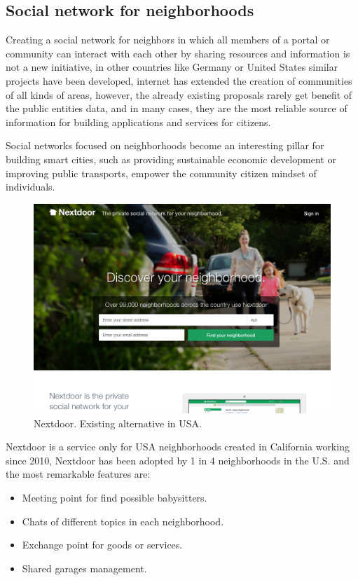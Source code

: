\documentclass{DeustoFDP}
\begin{document}
\subsection{Social network for neighborhoods}
Creating a social network for neighbors in which all members of a portal or community can interact with each other by sharing resources and information is not a new initiative, in other countries like Germany or United States similar projects \cite{larazon} have been developed, internet has extended the creation of communities of all kinds of areas, however, the already existing proposals rarely get benefit of the public entities data, and in many cases, they are the most reliable source of information for building applications and services for citizens.

Social networks focused on neighborhoods become an interesting pillar for building smart cities, such as providing sustainable economic development or improving public transports, empower the community citizen mindset of individuals.

\begin{figure}[H]
\centering
\includegraphics[width=0.7\linewidth]{fig/nextdoor}
\caption[Nextdoor]{Nextdoor. Existing alternative in USA.}
\label{fig:nextdoor}
\end{figure}
Nextdoor is a service only for USA neighborhoods created in California working since 2010, Nextdoor has been adopted by 1 in 4 neighborhoods in the U.S. \cite{theverge} and the most remarkable features are:

\begin{itemize}
	\item Meeting point for find possible babysitters.
	\item Chats of different topics in each neighborhood.
	\item Exchange point for goods or services.
	\item Shared garages management.
\end{itemize}
\end{document}
